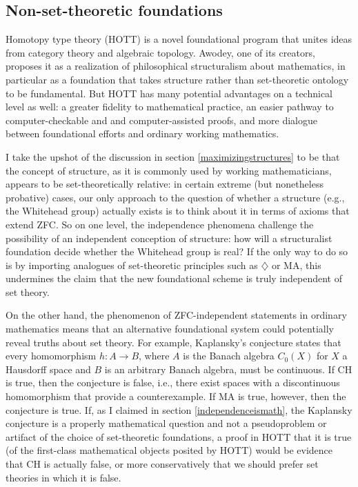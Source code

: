 \documentclass[letterpaper,12pt]{article}
\begin{document}
\subsection{Non-set-theoretic foundations}
\label{alternatefoundations}
Homotopy type theory (HOTT) is a novel foundational program that unites ideas from category theory and algebraic topology. Awodey, one of its creators, proposes it \citeyearpar{awodey2014structuralism} as a realization of philosophical structuralism about mathematics, in particular as a foundation that takes structure rather than set-theoretic ontology to be fundamental. But HOTT has many potential advantages on a technical level as well: a greater fidelity to mathematical practice, an easier pathway to computer-checkable and and computer-assisted proofs, and more dialogue between foundational efforts and ordinary working mathematics.

I take the upshot of the discussion in section \ref{maximizingstructures} to be that the concept of structure, as it is commonly used by working mathematicians, appears to be set-theoretically relative: in certain extreme (but nonetheless probative) cases, our only approach to the question of whether a structure (e.g., the Whitehead group) actually exists is to think about it in terms of axioms that extend ZFC. So on one level, the independence phenomena challenge the possibility of an independent conception of structure: how will a structuralist foundation decide whether the Whitehead group is real? If the only way to do so is by importing analogues of set-theoretic principles such as $\diamondsuit$ or MA, this undermines the claim that the new foundational scheme is truly independent of set theory.


On the other hand, the phenomenon of ZFC-independent statements in ordinary mathematics means that an alternative foundational system could potentially reveal truths about set theory. For example, Kaplansky's conjecture states that every homomorphism $h: A \to B$, where $A$ is the Banach algebra $C_0(X)$ for $X$ a Hausdorff space and $B$ is an arbitrary Banach algebra, must be continuous. If CH is true, then the conjecture is false, i.e., there exist spaces with a discontinuous homomorphism that provide a counterexample. If MA is true, however, then the conjecture is true. If, as I claimed in section \ref{independenceismath}, the Kaplansky conjecture is a properly mathematical question and not a pseudoproblem or artifact of the choice of set-theoretic foundations, a proof in HOTT that it is true (of the first-class mathematical objects posited by HOTT) would be evidence that CH is actually false, or more conservatively that we should prefer set theories in which it is false.
\end{document}
